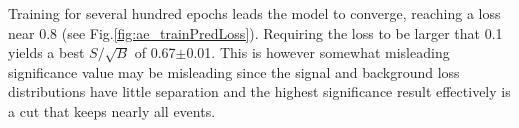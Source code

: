 Training for several hundred epochs leads the model to converge, reaching a loss near 0.8 (see Fig.\ref{fig:ae_trainPredLoss}). Requiring the loss to be larger that 0.1 yields a best $S/\sqrt{B}$ of 0.67$\pm$0.01. This is however somewhat misleading significance value may be misleading since the signal and background loss distributions have little separation and the highest significance result effectively is a cut that keeps nearly all events. 

